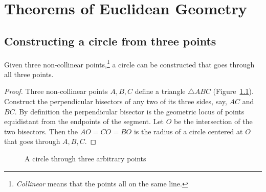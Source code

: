 
\chapter{Theorems of Euclidean Geometry}\label{s.elementary}

\section{Constructing a circle from three points}

\begin{theorem}\label{thm.three-points}
Given three non-collinear points,\footnote{\emph{Collinear} means that the points all on the same line.} a circle can be constructed that goes through all three points.
\end{theorem}

\begin{proof}
Three non-collinear points $A,B,C$ define a triangle $\triangle ABC$ (Figure~\ref{f.kepler-circumscribed}). Construct the perpendicular bisectors of any two of its three sides, say, $AC$ and $BC$. By definition the perpendicular bisector is the geometric locus of points equidistant from the endpoints of the segment. Let $O$ be the intersection of the two bisectors. Then the $AO=CO=BO$ is the radius of a circle centered at $O$ that goes through $A,B,C$.\hqed
\end{proof}

\begin{figure}[b]
\begin{center}
\caption{A circle through three arbitrary points}\label{f.kepler-circumscribed}
\end{center}
\end{figure}

